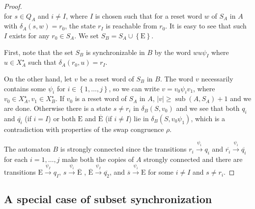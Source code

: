 \documentclass{ws-ijmpc}
\DeclareMathOperator{\sub}{sub}
\begin{document}
\begin{proof}
\[\]
for $s\in Q_{A}$ and $i\neq I$, where $I$ is chosen such that for
a reset word $w$ of $S_{A}$ in $A$ with $\delta_{A}\!\left(s,w\right)=r_{0}$,
the state $r_{I}$ is reachable from $r_{0}$. It is easy to see that
such $I$ exists for any $r_{0}\in S_{A}$. We set $S_{B}=S_{A}\cup\left\{ \mathrm{E}\right\} $.
\begin{itemlist}
\item First, note that the set $S_{B}$ is synchronizable in $B$ by the
word $wu\psi_{I}$ where $u\in X_{A}^{\star}$ such that $\delta_{A}\!\left(r_{0},u\right)=r_{I}$. 
\item On the other hand, let $v$ be a reset word of $S_{B}$ in $B$. The
word $v$ necessarily contains some $\psi_{i}$ for $i\in\left\{ 1,\dots,j\right\} $,
so we can write $v=v_{0}\psi_{i}v_{1}$, where $v_{0}\in X_{A}^{\star},v_{1}\in X_{B}^{\star}$.
If $v_{0}$ is a reset word of $S_{A}$ in $A$, $\left|v\right|\ge\sub\!\left(A,S_{A}\right)+1$
and we are done. Otherwise there is a state $s\neq r_{i}$ in $\delta_{B}\!\left(S,v_{0}\right)$
and we see that both $q_{i}$ and $\overline{q_{i}}$ (if $i=I$)
or both $\mathrm{E}$ and $\overline{\mathrm{E}}$ (if $i\neq I$)
lie in $\delta_{B}\!\left(S,v_{0}\psi_{1}\right)$, which is a contradiction
with properties of the swap congruence $\rho$.
\end{itemlist}
The automaton $B$ is strongly connected since the transitions $r_{i}\overset{\psi_{i}}{\longrightarrow}q_{i}$
and $\overline{r_{i}}\overset{\psi_{i}}{\longrightarrow}\overline{q_{i}}$
for each $i=1,\dots,j$ make both the copies of $A$ strongly connected
and there are transitions $\mathrm{E}\overset{\psi_{I}}{\longrightarrow}q_{I}$,
$s\overset{\psi_{i}}{\longrightarrow}\overline{\mathrm{E}}$ , $\overline{\mathrm{E}}\overset{\psi_{I}}{\longrightarrow}\overline{q_{2}}$,
and $\overline{s}\overset{\psi_{i}}{\longrightarrow}\mathrm{E}$ for
some $i\neq I$ and $s\neq r_{i}$.
\end{proof}

\subsection{A special case of subset synchronization}
\end{document}
